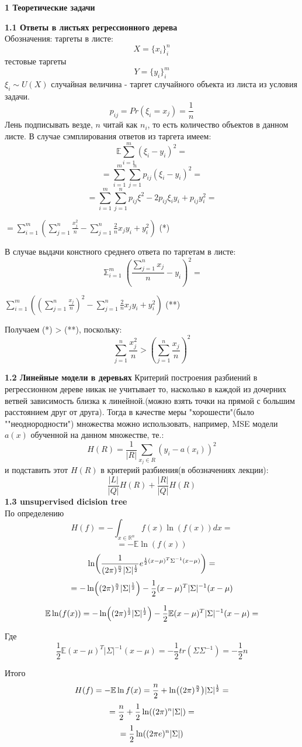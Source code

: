 \documentclass[11pt,a4paper]{article}
\newcommand{\lnb}[1]{%
  \ln\mleft(#1\mright)%
}
\begin{document}
\begin{center}
\Huge {
\noindent
\textbf{1 Теоретические задачи}
}
\end{center}

\Large {
\textbf {1.1 Ответы в листьях регрессионного дерева}
}
\\
Обозначения:
таргеты в листе:
$$ X = \{x_i\}_i^n $$
тестовые таргеты
$$ Y = \{y_i\}_i^m $$
$\xi_i \sim U(X)$ случайная величина - таргет случайного объекта из листа из условия задачи.
$$ p_{ij} = Pr(\xi_i = x_j) = \frac{1}{n}$$
Лень подписывать везде, $n$ читай как $n_i$, то есть количество объектов в данном листе.
В случае сэмплирования ответов из таргета имеем:
\\
$$\mathbb{E} \sum_{i=1}^m (\xi_i - y_i)^2 =$$
$$ = \sum_{i=1}^m \sum_{j=1}^n p_{ij} (\xi_i - y_i)^2 =$$
$$ = \sum_{i=1}^m \sum_{j=1}^n p_{ij} \xi^2 - 2p_{ij} \xi_i y_i + p_{ij}y_i^2 = $$
\begin{center}
$ = \sum_{i=1}^m( \sum_{j=1}^n {\frac{x_j^2}{n}} - \sum_{j=1}^n \frac{2}{n} x_j y_i + y_i^2)$ (*)
\end{center}
В случае выдачи констного среднего ответа по таргетам в листе:
\\
$$ \mathbb \sum_{i=1}^m (\frac{\sum_{j=1}^n x_j}{n} - y_i)^2 = $$
\begin{center}
$ \sum_{i=1}^m ( (\sum_{j=1}^n \frac{x_j}{n})^2 - \sum_{j=1}^n \frac{2}{n} x_j y_i + y_i^2)$ (**)
\end{center}
Получаем (*) > (**), поскольку:
$$ \sum_{j=1}^n \frac{x_j^2}{n} > (\sum_{j=1}^n \frac{x_j}{n})^2 $$

\Large {
\textbf {1.2 Линейные модели в деревьях}
}
Критерий построения разбиений в регрессионном дереве никак не учитывает то, насколько в каждой из дочерних ветвей зависимость близка к линейной.(можно взять точки на прямой с большим расстоянием друг от друга).
Тогда в качестве меры "хорошести"(было ""неоднородности") множества можно использовать, например, MSE модели $a(x)$ обученной на данном множестве, те.:
$$ H(R) = \frac{1}{|R|} \sum_{x_j \in R}(y_i - a(x_i))^2 $$
и подставить этот $H(R)$ в критерий разбиения(в обозначениях лекции):
$$ \frac{|L|}{|Q|} H(R) + \frac{|R|}{|Q|} H(R) $$
\Large {
\textbf {1.3 unsupervised dicision tree}
}
\\
По определению $$H(f) = -\int_{x \in \mathbb{R}^n}^{} f(x) \ln(f(x))dx = $$
$$ = -\mathbb{E}\ln(f(x)) $$
$$ \lnb{\frac{1}{(2\pi)^{\frac{n}{2}} |\Sigma|^{\frac{1}{2}} } e^{ \frac{1}{2} (x - \mu)^T \Sigma^{-1} (x-\mu) }} = $$
$$ = -\lnb{(2\pi)^{\frac{n}{2}} |\Sigma|^{\frac{1}{2}}} - \frac{1}{2} (x - \mu)^T |\Sigma|^{-1} (x - \mu)$$

$$ \mathbb{E} \lnb{f(x)} = -\lnb{(2\pi)^{\frac{1}{2}} |\Sigma|^{\frac{1}{2}}} - \frac{1}{2} \mathbb{E} (x-\mu)^T |\Sigma|^{-1} (x - \mu) = $$

Где $$ \frac{1}{2} \mathbb{E} (x-\mu)^T |\Sigma|^{-1} (x - \mu) =  -\frac{1}{2} tr(\Sigma \Sigma^{-1}) = -\frac{1}{2}n$$

Итого
$$ H(f) =  -\mathbb{E}\ln f(x)  = \frac{n}{2} + \lnb{(2\pi)^{\frac{n}{2}}} |\Sigma|^{\frac{1}{2}} =$$
$$ = \frac{n}{2} + \frac{1}{2} \lnb {(2\pi)^n |\Sigma|} = $$
$$ = \frac{1}{2} \lnb{(2\pi e)^n |\Sigma|} $$
\end{document}
